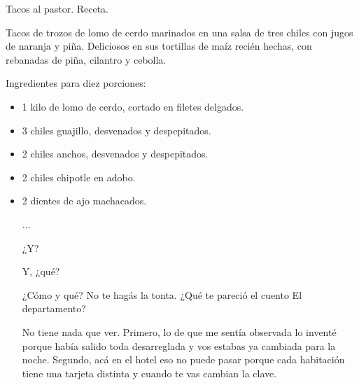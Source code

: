 \documentclass[12pt,twoside,openright,a5paper]{book}
\begin{document}
\vspace{0.5cm}

\hrulefill\hspace{0.2cm} \decofourleft\decofourright \hspace{0.2cm} \hrulefill
\vspace{0.5cm}

Tacos al pastor. Receta.

Tacos de trozos de lomo de cerdo marinados en una salsa de tres chiles
con jugos de naranja y piña. Deliciosos en sus tortillas de maíz recién
hechas, con rebanadas de piña, cilantro y cebolla.

Ingredientes para diez porciones:

\begin{itemize} \item 1 kilo de lomo de cerdo, cortado en filetes delgados.
\item 3 chiles guajillo, desvenados y despepitados.  \item 2 chiles anchos,
desvenados y despepitados.  \item 2 chiles chipotle en adobo.  \item 2
dientes de ajo machacados.

...


\vspace{0.5cm}

\hrulefill\hspace{0.2cm} \decofourleft\decofourright \hspace{0.2cm} \hrulefill
\vspace{0.5cm}

¿Y?

Y, ¿qué?

¿Cómo y qué? No te hagás la tonta. ¿Qué te pareció el cuento El
departamento?

No tiene nada que ver. Primero, lo de que me sentía observada lo inventé
porque había salido toda desarreglada y vos estabas ya cambiada para la
noche. Segundo, acá en el hotel eso no puede pasar porque cada habitación
tiene una tarjeta distinta y cuando te vas cambian la clave.

\vspace{0.5cm}

\hrulefill\hspace{0.2cm} \decofourleft\decofourright \hspace{0.2cm} \hrulefill
\vspace{0.5cm}


\end{itemize}
\end{document}
